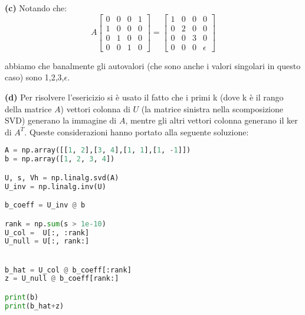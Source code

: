 \documentclass{article}
\begin{document}
\textbf{(c)}
Notando che:
\[
A \begin{bmatrix}
0 & 0 & 0 & 1 \\
1 & 0 & 0 & 0 \\
0 & 1 & 0 & 0 \\
0 & 0 & 1 & 0
\end{bmatrix}
= 
\begin{bmatrix}
1 & 0 & 0 & 0 \\
0 & 2 & 0 & 0 \\
0 & 0 & 3 & 0 \\
0 & 0 & 0 & \epsilon
\end{bmatrix}
\] 

abbiamo che banalmente gli autovalori (che sono anche i valori singolari in questo caso) sono 1,2,3,$\epsilon$.

\textbf{(d)}
Per risolvere l'esericizio si è usato il fatto che i primi k (dove k è il rango della matrice $A$) vettori colonna di $U$ (la matrice sinistra nella scomposizione SVD) generano la immagine di $A$, mentre gli altri vettori colonna generano il ker di $A^T$. Queste considerazioni hanno portato alla seguente soluzione:
\begin{lstlisting}[language = Python]
A = np.array([[1, 2],[3, 4],[1, 1],[1, -1]])
b = np.array([1, 2, 3, 4])

U, s, Vh = np.linalg.svd(A)
U_inv = np.linalg.inv(U)

b_coeff = U_inv @ b

rank = np.sum(s > 1e-10)
U_col =  U[:, :rank]
U_null = U[:, rank:]


b_hat = U_col @ b_coeff[:rank]
z = U_null @ b_coeff[rank:]

print(b)
print(b_hat+z)
\end{lstlisting}
\end{document}
